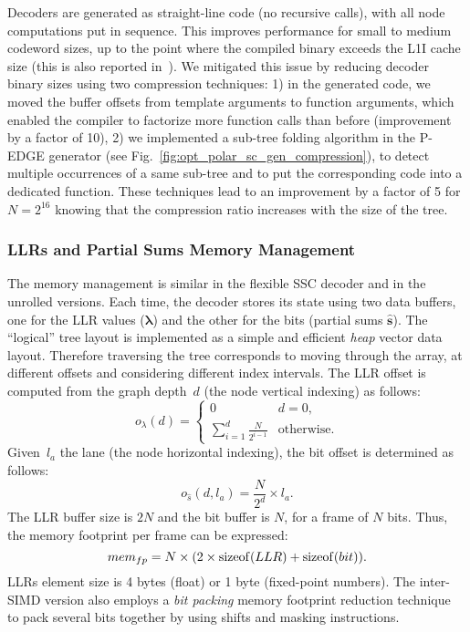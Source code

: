 Decoders are generated as straight-line code (no recursive calls), with all node
computations put in sequence. This improves performance for small to medium
codeword sizes, up to the point where the compiled binary exceeds the L1I cache
size (this is also reported in~\cite{Giard2016b}). We mitigated this issue by
reducing decoder binary sizes using two compression techniques: 1) in the
generated code, we moved the buffer offsets from template arguments to function
arguments, which enabled the compiler to factorize more function calls than
before (improvement by a factor of 10), 2) we implemented a sub-tree folding
algorithm in the P-EDGE generator (see
Fig.~\ref{fig:opt_polar_sc_gen_compression}), to detect multiple occurrences of
a same sub-tree and to put the corresponding code into a dedicated function.
These techniques lead to an improvement by a factor of 5 for $N=2^{16}$ knowing
that the compression ratio increases with the size of the tree.

\newpage
\subsubsection{LLRs and Partial Sums Memory Management}

The memory management is similar in the flexible SSC decoder and in the unrolled
versions. Each time, the decoder stores its state using two data buffers, one
for the LLR values ($\bm{\lambda}$) and the other for the bits (partial sums
$\bm{\hat{s}}$). The ``logical'' tree layout is implemented as a simple and
efficient \emph{heap} vector data layout. Therefore traversing the tree
corresponds to moving through the array, at different offsets and considering
different index intervals. The LLR offset is computed from the graph depth~$d$
(the node vertical indexing) as follows:
\begin{equation}
 o_{\lambda}(d) = \begin{cases}
   0                                         &\text{$d = 0$},\\
   \sum\limits_{i = 1}^{d} \frac{N}{2^{i-1}} &\text{otherwise.}
\end{cases}
\end{equation}
Given~$l_a$ the lane (the node horizontal indexing), the bit offset is
determined as follows:
\begin{equation}
  o_{\hat{s}}(d,l_a) = \frac{N}{2^d} \times l_a.
\end{equation}
The LLR buffer size is $2N$ and the bit buffer is $N$, for a frame of $N$ bits.
Thus, the memory footprint per frame can be expressed:
\begin{equation}
  mem_{fp} = N \times (2 \times \operatorname*{sizeof}(LLR) + \operatorname*{sizeof}(bit)).
\end{equation}
LLRs element size is 4 bytes (float) or 1 byte (fixed-point numbers). The
inter-SIMD version also employs a \emph{bit packing} memory footprint reduction
technique~\cite{LeGal2015a} to pack several bits together by using shifts and
masking instructions.

